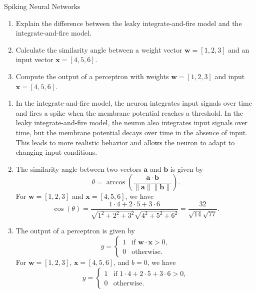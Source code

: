 \documentclass{article}
\begin{document}
\begin{exercise}{Spiking Neural Networks}
  \begin{enumerate}
    \item Explain the difference between the leaky integrate-and-fire model and the integrate-and-fire model.
    \item Calculate the similarity angle between a weight vector $\mathbf{w} = [1, 2, 3]$ and an input vector $\mathbf{x} = [4, 5, 6]$.
    \item Compute the output of a perceptron with weights $\mathbf{w} = [1, 2, 3]$ and input $\mathbf{x} = [4, 5, 6]$.
  \end{enumerate}

  \begin{solution}
    \begin{enumerate}
      \item In the integrate-and-fire model, the neuron integrates input signals over time and fires a spike when the membrane potential reaches a threshold. In the leaky integrate-and-fire model, the neuron also integrates input signals over time, but the membrane potential decays over time in the absence of input. This leads to more realistic behavior and allows the neuron to adapt to changing input conditions.
      \item The similarity angle between two vectors $\mathbf{a}$ and $\mathbf{b}$ is given by
        \[ \theta = \arccos(\frac{\mathbf{a} \cdot \mathbf{b}}{\|\mathbf{a}\| \|\mathbf{b}\|}). \]
        For $\mathbf{w} = [1, 2, 3]$ and $\mathbf{x} = [4, 5, 6]$, we have
        \[ \cos(\theta) = \frac{1 \cdot 4 + 2 \cdot 5 + 3 \cdot 6}{\sqrt{1^2 + 2^2 + 3^2} \sqrt{4^2 + 5^2 + 6^2}} = \frac{32}{\sqrt{14} \sqrt{77}}. \]
      \item The output of a perceptron is given by
        \[
          y = \begin{cases}
            1 & \text{if } \mathbf{w} \cdot \mathbf{x} > 0, \\
            0 & \text{otherwise}.
          \end{cases}
        \]
        For $\mathbf{w} = [1, 2, 3]$, $\mathbf{x} = [4, 5, 6]$, and $b = 0$, we have
        \[
          y = \begin{cases}
            1 & \text{if } 1 \cdot 4 + 2 \cdot 5 + 3 \cdot 6 > 0, \\
            0 & \text{otherwise}.
          \end{cases}
        \]
    \end{enumerate}
  \end{solution}
\end{exercise}
\end{document}

